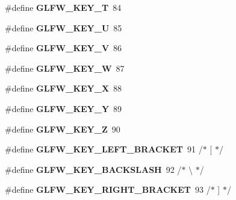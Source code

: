 \begin{DoxyCompactItemize}
\item 
\hypertarget{group__keys_ga90e0560422ec7a30e7f3f375bc9f37f9}{}\#define {\bfseries G\+L\+F\+W\+\_\+\+K\+E\+Y\+\_\+\+T}~84\label{group__keys_ga90e0560422ec7a30e7f3f375bc9f37f9}

\item 
\hypertarget{group__keys_gacad52f3bf7d378fc0ffa72a76769256d}{}\#define {\bfseries G\+L\+F\+W\+\_\+\+K\+E\+Y\+\_\+\+U}~85\label{group__keys_gacad52f3bf7d378fc0ffa72a76769256d}

\item 
\hypertarget{group__keys_ga22c7763899ecf7788862e5f90eacce6b}{}\#define {\bfseries G\+L\+F\+W\+\_\+\+K\+E\+Y\+\_\+\+V}~86\label{group__keys_ga22c7763899ecf7788862e5f90eacce6b}

\item 
\hypertarget{group__keys_gaa06a712e6202661fc03da5bdb7b6e545}{}\#define {\bfseries G\+L\+F\+W\+\_\+\+K\+E\+Y\+\_\+\+W}~87\label{group__keys_gaa06a712e6202661fc03da5bdb7b6e545}

\item 
\hypertarget{group__keys_gac1c42c0bf4192cea713c55598b06b744}{}\#define {\bfseries G\+L\+F\+W\+\_\+\+K\+E\+Y\+\_\+\+X}~88\label{group__keys_gac1c42c0bf4192cea713c55598b06b744}

\item 
\hypertarget{group__keys_gafd9f115a549effdf8e372a787c360313}{}\#define {\bfseries G\+L\+F\+W\+\_\+\+K\+E\+Y\+\_\+\+Y}~89\label{group__keys_gafd9f115a549effdf8e372a787c360313}

\item 
\hypertarget{group__keys_gac489e208c26afda8d4938ed88718760a}{}\#define {\bfseries G\+L\+F\+W\+\_\+\+K\+E\+Y\+\_\+\+Z}~90\label{group__keys_gac489e208c26afda8d4938ed88718760a}

\item 
\hypertarget{group__keys_gad1c8d9adac53925276ecb1d592511d8a}{}\#define {\bfseries G\+L\+F\+W\+\_\+\+K\+E\+Y\+\_\+\+L\+E\+F\+T\+\_\+\+B\+R\+A\+C\+K\+E\+T}~91  /$\ast$ \mbox{[} $\ast$/\label{group__keys_gad1c8d9adac53925276ecb1d592511d8a}

\item 
\hypertarget{group__keys_gab8155ea99d1ab27ff56f24f8dc73f8d1}{}\#define {\bfseries G\+L\+F\+W\+\_\+\+K\+E\+Y\+\_\+\+B\+A\+C\+K\+S\+L\+A\+S\+H}~92  /$\ast$ \textbackslash{} $\ast$/\label{group__keys_gab8155ea99d1ab27ff56f24f8dc73f8d1}

\item 
\hypertarget{group__keys_ga86ef225fd6a66404caae71044cdd58d8}{}\#define {\bfseries G\+L\+F\+W\+\_\+\+K\+E\+Y\+\_\+\+R\+I\+G\+H\+T\+\_\+\+B\+R\+A\+C\+K\+E\+T}~93  /$\ast$ \mbox{]} $\ast$/\label{group__keys_ga86ef225fd6a66404caae71044cdd58d8}


\end{DoxyCompactItemize}
